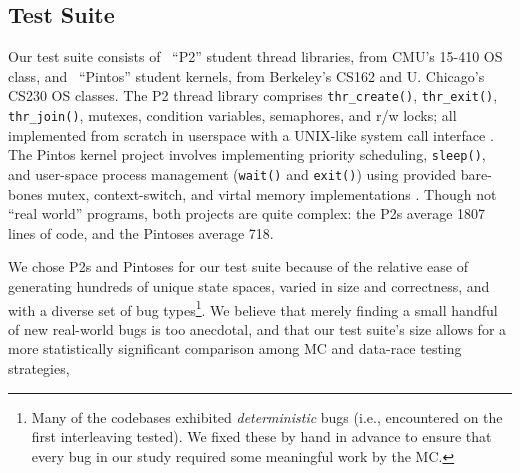 
\subsection{Test Suite}
Our test suite consists of \numthrlibs~``P2'' student thread libraries, from CMU's 15-410 OS class,
and \numpintoses~``Pintos'' student kernels, from Berkeley's CS162 and U. Chicago's CS230 OS classes.
%
The P2 thread library comprises \texttt{thr\_create()}, \texttt{thr\_exit()}, \texttt{thr\_join()}, mutexes, condition variables, semaphores, and r/w locks;
all implemented from scratch in userspace with a UNIX-like system call interface \cite{kspec,thrlib}.
%
The Pintos kernel project
involves implementing priority scheduling, \texttt{sleep()}, and user-space process management (\texttt{wait()} and \texttt{exit()})
using provided bare-bones mutex, context-switch, and virtal memory implementations
\cite{pintos}.
Though not ``real world'' programs, both projects are quite complex:
the P2s average 1807 lines of code,%
and the Pintoses average 718.

We chose P2s and Pintoses for our test suite because of the relative ease of generating hundreds of unique state spaces,
varied in size and correctness, and with a diverse set of bug types\footnote{
Many of the codebases exhibited {\em deterministic} bugs (i.e., encountered on the first interleaving tested).
We fixed these by hand in advance to ensure that every bug in our study required some meaningful work by the MC.}.
We believe that merely finding a small handful of new real-world bugs is too anecdotal,
and that our test suite's size allows for a more statistically significant comparison among MC and data-race testing strategies,

